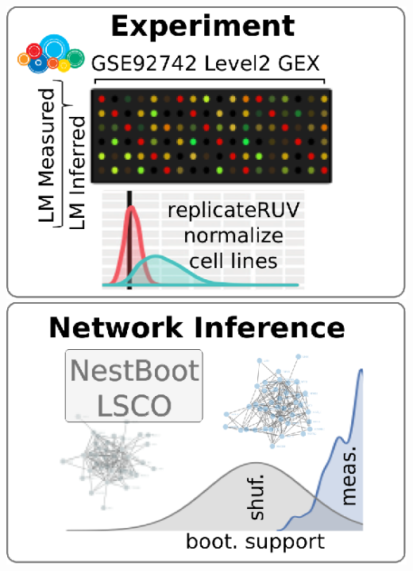 \documentclass[a0,portrait]{a0poster}
\begin{document}
\begin{multicols}{2}
\begin{multicols}{2}
\begin{tabular}{l l l l}
\end{tabular}
\end{multicols}

\begin{center} \vspace{.15cm}
\includegraphics[width=.45\linewidth]{L1000_method_1.eps}
\hspace{.25cm}\vspace{.1cm}
\includegraphics[width=.5\linewidth]{L1000_method_2.eps}
\end{center}
\vspace{-.3cm}



\end{multicols}
\end{document}
